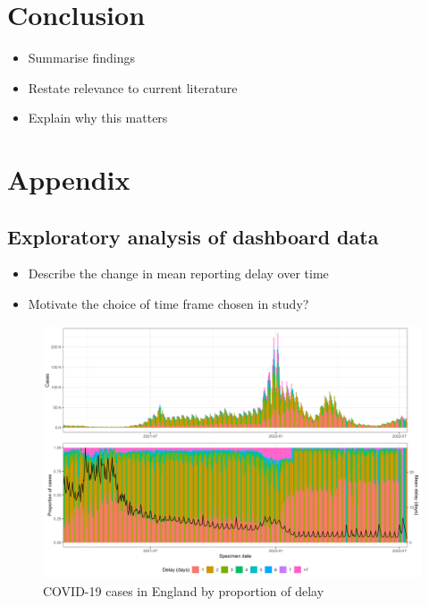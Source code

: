 \documentclass[
  a4paper,
]{article}
\providecommand{\tightlist}{%
  \setlength{\itemsep}{0pt}\setlength{\parskip}{0pt}}\usepackage{longtable,booktabs,array}
\begin{document}
\hypertarget{conclusion}{%
\section{Conclusion}\label{conclusion}}

\begin{itemize}
\tightlist
\item
  Summarise findings
\item
  Restate relevance to current literature
\item
  Explain why this matters
\end{itemize}

\hypertarget{appendix}{%
\section{Appendix}\label{appendix}}

\hypertarget{exploratory-analysis-of-dashboard-data}{%
\subsection{Exploratory analysis of dashboard
data}\label{exploratory-analysis-of-dashboard-data}}

\begin{itemize}
\tightlist
\item
  Describe the change in mean reporting delay over time
\item
  Motivate the choice of time frame chosen in study?
\end{itemize}

\begin{figure}

{\centering \includegraphics{images/cases-delay-england.png}

}

\caption{COVID-19 cases in England by proportion of delay}

\end{figure}
\end{document}
